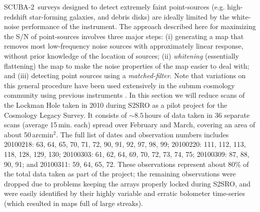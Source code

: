 \documentclass[useAMS,usenatbib,nofootinbib]{mn2e}
\newcommand{\scuba}{SCUBA-2}
\begin{document}
\scuba\ surveys designed to detect extremely faint point-sources
(e.g. high-redshift star-forming galaxies, and debris disks) are
ideally limited by the white-noise performance of the instrument. The
approach described here for maximizing the S/N of point-sources
involves three major steps: (i) generating a map that removes most
low-frequency noise sources with approximately linear response,
without prior knowledge of the location of sources; (ii)
\emph{whitening} (essentially flattening) the map to make the noise
properties of the map easier to deal with; and (iii) detecting point
sources using a \emph{matched-filter}. Note that variations on this
general procedure have been used extensively in the submm cosmology
community using previous instruments
\citep[e.g.][]{scott2002,laurent2005,coppin2006,scott2008,perera2008,devlin2009}.
In this section we will reduce scans of the Lockman Hole taken in 2010
during S2SRO as a pilot project for the Cosmology Legacy Survey. It
consists of $\sim8.5$\,hours of data taken in 36 separate scans
(average 15\,min. each) spread over February and March, covering an
area of about 50\,arcmin$^2$. The full list of dates and observation
numbers includes 20100218: 63, 64, 65, 70, 71, 72, 90, 91, 92, 97, 98,
99; 20100220: 111, 112, 113, 118, 128, 129, 130; 20100303: 61, 62, 64,
69, 70, 72, 73, 74, 75; 20100309: 87, 88, 90, 91; and 20100311: 59,
64, 65, 72. These observations represent about 80\% of the total data
taken as part of the project; the remaining observations were dropped
due to problems keeping the arrays properly locked during S2SRO, and
were easily identified by their highly variable and erratic bolometer
time-series (which resulted in maps full of large streaks).
\end{document}
